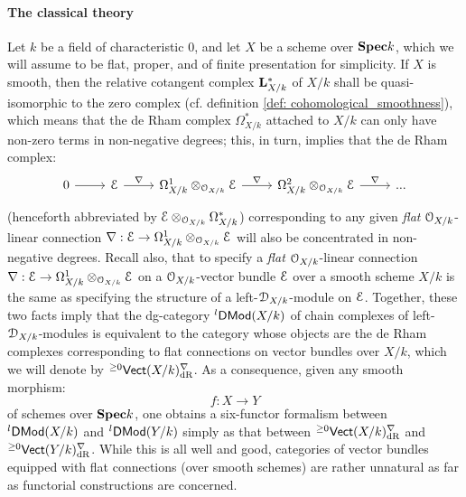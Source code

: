         \paragraph*{The classical theory}
            Let $k$ be a field of characteristic $0$, and let $X$ be a scheme over $\mathbf{Spec} k$, which we will assume to be flat, proper, and of finite presentation for simplicity. If $X$ is smooth, then the relative cotangent complex $\mathbf{L}^*_{X/k}$ of $X/k$ shall be quasi-isomorphic to the zero complex (cf. definition \ref{def: cohomological_smoothness}), which means that the de Rham complex $\Omega^*_{X/k}$ attached to $X/k$ can only have non-zero terms in non-negative degrees; this, in turn, implies that the de Rham complex:
                $$
                    \begin{tikzcd}
                    	0 & \E & {\Omega^1_{X/k} \tensor_{\calO_{X/k}} \E} & {\Omega^2_{X/k} \tensor_{\calO_{X/k}} \E} & {...}
                    	\arrow["\nabla", from=1-4, to=1-5]
                    	\arrow["\nabla", from=1-3, to=1-4]
                    	\arrow["\nabla", from=1-2, to=1-3]
                    	\arrow[from=1-1, to=1-2]
                    \end{tikzcd}
                $$
            (henceforth abbreviated by $\E \tensor_{\calO_{X/k}} \Omega^*_{X/k}$) corresponding to any given \textit{flat} $\mathcal{O}_{X/k}$-linear connection $\nabla: \E \to \Omega^1_{X/k} \tensor_{\calO_{X/k}} \E$ will also be concentrated in non-negative degrees. Recall also, that to specify a \textit{flat} $\mathcal{O}_{X/k}$-linear connection $\nabla: \E \to \Omega^1_{X/k} \tensor_{\calO_{X/k}} \E$ on a $\mathcal{O}_{X/k}$-vector bundle $\mathcal{E}$ over a smooth scheme $X/k$ is the same as specifying the structure of a left-$\mathcal{D}_{X/k}$-module on $\mathcal{E}$. Together, these two facts imply that the dg-category ${}^l\mathsf{DMod}(X/k)$ of chain complexes of left-$\mathcal{D}_{X/k}$-modules is equivalent to the category whose objects are the de Rham complexes corresponding to flat connections on vector bundles over $X/k$, which we will denote by ${}^{\geq 0}\mathsf{Vect}(X/k)^{\nabla}_{\mathrm{dR}}$. As a consequence, given any smooth morphism:
                $$f: X \to Y$$
            of schemes over $\mathbf{Spec} k$, one obtains a six-functor formalism between ${}^l\mathsf{DMod}(X/k)$ and ${}^l\mathsf{DMod}(Y/k)$ simply as that between ${}^{\geq 0}\mathsf{Vect}(X/k)^{\nabla}_{\mathrm{dR}}$ and ${}^{\geq 0}\mathsf{Vect}(Y/k)^{\nabla}_{\mathrm{dR}}$. While this is all well and good, categories of vector bundles equipped with flat connections (over smooth schemes) are rather unnatural as far as functorial constructions are concerned. 
            
